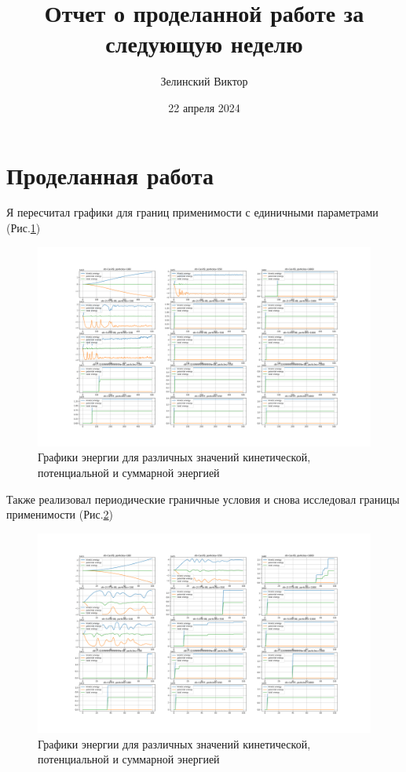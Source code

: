 \documentclass[a4paper, 12pt]{report}
\title{Отчет о проделанной работе за следующую неделю}
\author{Зелинский Виктор}
\date{22 апреля 2024}
\renewcommand{\figurename}{Рис.}
\begin{document}
	\maketitle
	\newpage
	\section{Проделанная работа}
	Я пересчитал графики для границ применимости с единичными параметрами (\figurename \ref{fig:euler_ones})
	\begin{figure}[h]
		\includegraphics[width=0.9\linewidth]{big_plot500(ones).png}
		\caption{Графики энергии для различных значений кинетической, потенциальной и суммарной энергией}
		\label{fig:euler_ones}
	\end{figure}

	Также реализовал периодические граничные условия и снова исследовал границы применимости (\figurename \ref{fig:euler_periodical})
	
	\begin{figure}[h]
		\includegraphics[width=0.9\linewidth]{big_plot100(periodical).png}
		\caption{Графики энергии для различных значений кинетической, потенциальной и суммарной энергией}
		\label{fig:euler_periodical}
	\end{figure}
	
\end{document}

